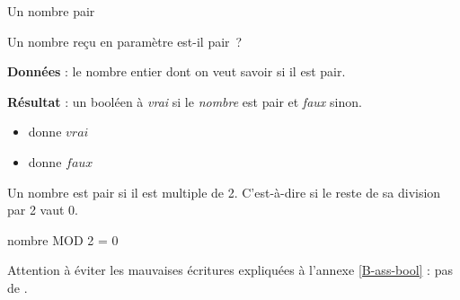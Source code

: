 \begin{Fiche}{Un nombre pair}
\label{fiche:calcul-pair}

	Un nombre reçu en paramètre est-il pair~?


	\textbf{Données} : le nombre entier dont on veut savoir si il est pair.
		
	\textbf{Résultat} : un booléen à \textit{vrai} si le \textit{nombre} est pair et \textit{faux} sinon.

	\begin{center}	
	\end{center}


	\begin{itemize}
	\item {} donne $vrai$
	\item {} donne $faux$
	\end{itemize}
	

	Un nombre est pair si il est multiple de 2. 
	C'est-à-dire si le reste de sa division par 2 vaut 0.

	\begin{LDA}
			\Return nombre MOD 2 = 0
		\EndAlgo
	\end{LDA}

	Attention à éviter les mauvaises écritures 
	expliquées à l'annexe \vref{B-ass-bool} :
	pas de \lda{\K{si-sinon}}.
	



\end{Fiche}
